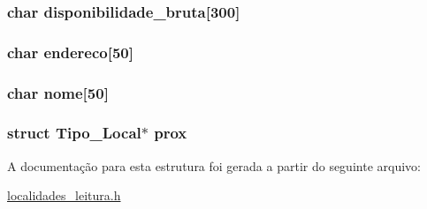 \subsubsection[{disponibilidade\+\_\+bruta}]{\setlength{\rightskip}{0pt plus 5cm}char disponibilidade\+\_\+bruta\mbox{[}300\mbox{]}}\label{struct_tipo___local_a683bf37aaa0892f657c2263c1a4bdd92}
\hypertarget{struct_tipo___local_a16f3ac8554441c8caab646a362ad2e35}{}
\subsubsection[{endereco}]{\setlength{\rightskip}{0pt plus 5cm}char endereco\mbox{[}50\mbox{]}}\label{struct_tipo___local_a16f3ac8554441c8caab646a362ad2e35}
\hypertarget{struct_tipo___local_ad9b32a94f9054fd81f59b1118b8d53d2}{}
\subsubsection[{nome}]{\setlength{\rightskip}{0pt plus 5cm}char nome\mbox{[}50\mbox{]}}\label{struct_tipo___local_ad9b32a94f9054fd81f59b1118b8d53d2}
\hypertarget{struct_tipo___local_af88870599f755b0ce0fff7e6e72c167f}{}
\subsubsection[{prox}]{\setlength{\rightskip}{0pt plus 5cm}struct {\bf Tipo\+\_\+\+Local}$\ast$ prox}\label{struct_tipo___local_af88870599f755b0ce0fff7e6e72c167f}


A documentação para esta estrutura foi gerada a partir do seguinte arquivo\+:\begin{DoxyCompactItemize}
\item 
\hyperlink{localidades__leitura_8h}{localidades\+\_\+leitura.\+h}\end{DoxyCompactItemize}
